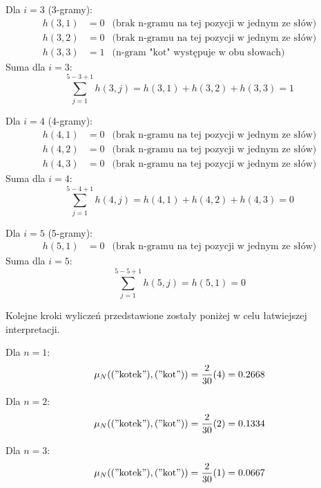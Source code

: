 \documentclass{article}
\begin{document}
\noindent Dla \( i = 3 \) (3-gramy):
\begin{align*}
    h(3, 1) &= 0 & \text{(brak n-gramu na tej pozycji w jednym ze słów)} \\
    h(3, 2) &= 0 & \text{(brak n-gramu na tej pozycji w jednym ze słów)} \\
    h(3, 3) &= 1 & \text{(n-gram "kot" występuje w obu słowach)}
\end{align*}
Suma dla \( i = 3 \):
\begin{equation}
\sum_{j=1}^{5-3+1} h(3, j) = h(3, 1) + h(3, 2) + h(3, 3) = 1
\end{equation}

\noindent Dla \( i = 4 \) (4-gramy):
\begin{align*}
    h(4, 1) &= 0 & \text{(brak n-gramu na tej pozycji w jednym ze słów)} \\
    h(4, 2) &= 0 & \text{(brak n-gramu na tej pozycji w jednym ze słów)} \\
    h(4, 3) &= 0 & \text{(brak n-gramu na tej pozycji w jednym ze słów)}
\end{align*}
Suma dla \( i = 4 \):
\begin{equation}
\sum_{j=1}^{5-4+1} h(4, j) = h(4, 1) + h(4, 2) + h(4, 3) = 0
\end{equation}

\noindent Dla \( i = 5 \) (5-gramy):
\begin{align*}
    h(5, 1) &= 0 & \text{(brak n-gramu na tej pozycji w jednym ze słów)}
\end{align*}
Suma dla \( i = 5 \):
\begin{equation}
\sum_{j=1}^{5-5+1} h(5, j) = h(5, 1) = 0
\end{equation}


\noindent Kolejne kroki wyliczeń przedstawione zostały poniżej w celu łatwiejszej interpretacji. \newline

Dla $n = 1$:
\begin{equation}
    \mu_N(("\text{kotek}"), ("\text{kot}")) = \frac{2}{30} (4) = 0.2668
\end{equation}

Dla $n = 2$:
\begin{equation}
    \mu_N(("\text{kotek}"), ("\text{kot}")) = \frac{2}{30} (2) = 0.1334
\end{equation}

Dla $n = 3$:
\begin{equation}
    \mu_N(("\text{kotek}"), ("\text{kot}")) = \frac{2}{30} (1) = 0.0667
\end{equation}
\end{document}
